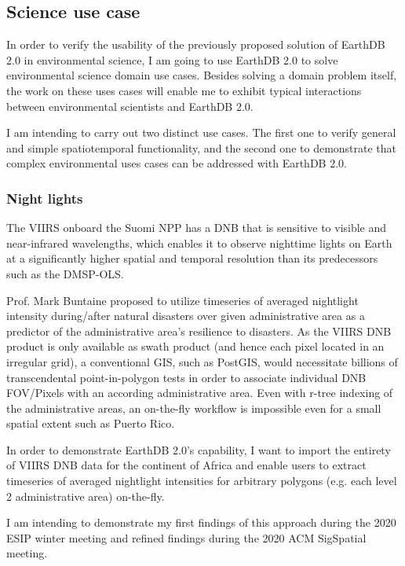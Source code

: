 \documentclass[letterpaper, parskip=half]{scrartcl}
\begin{document}
\newpage



\subsection{Science use case}
In order to verify the usability of the previously proposed solution of EarthDB 2.0 in environmental science, I am going to use EarthDB 2.0 to solve environmental science domain use cases. Besides solving a domain problem itself, the work on these uses cases will enable me to exhibit typical interactions between environmental scientists and EarthDB 2.0.

I am intending to carry out two distinct use cases. The first one to verify general and simple spatiotemporal functionality, and the second one to demonstrate that complex environmental uses cases can be addressed with EarthDB 2.0.

\subsubsection{Night lights}
The \gls{VIIRS} onboard the Suomi \gls{NPP} has a \gls{DNB} that is sensitive to visible and near-infrared wavelengths, which enables it to observe nighttime lights on Earth at a significantly higher spatial and temporal resolution than its predecessors such as the \gls{DMSP}-\gls{OLS}. 

Prof. Mark Buntaine proposed to utilize timeseries of averaged nightlight intensity during/after natural disasters over  given administrative area as a predictor of the administrative area's resilience to disasters. 
As the \gls{VIIRS} \gls{DNB} product is only available as swath product (and hence each pixel located in an irregular grid), a conventional \gls{GIS}, such as PostGIS, would necessitate billions of transcendental point-in-polygon tests in order to associate individual DNB \gls{FOV}/Pixels with an according administrative area. Even with r-tree indexing of the administrative areas, an on-the-fly workflow is impossible even for a small spatial extent such as Puerto Rico.

In order to demonstrate EarthDB 2.0's capability, I want to import the entirety of \gls{VIIRS} \gls{DNB} data for the continent of Africa and enable users to extract timeseries of averaged nightlight intensities for arbitrary polygons (e.g. each level 2 administrative area) on-the-fly. 

I am intending to demonstrate my first findings of this approach during the 2020 ESIP winter meeting and refined findings during the 2020 ACM SigSpatial meeting.
\end{document}
